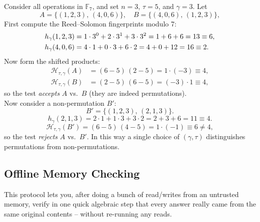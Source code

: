 \documentclass[../../book]{subfiles}
\begin{document}
\begin{example}
    Consider all operations in $\mathbb{F}_7$, and set $n=3$, $\tau=5$, and $\gamma=3$.  
    Let
    \begin{equation*}
      A = \{(1,2,3),\,(4,0,6)\}, \quad
      B = \{(4,0,6),\,(1,2,3)\},
    \end{equation*}
    First compute the Reed–Solomon fingerprints modulo 7:
    \begin{align*}
        h_{\gamma}(1,2,3) &=1\cdot3^0 + 2\cdot3^1 + 3\cdot3^2 =1 + 6 + 6 =13 \equiv 6,\\
        h_{\gamma}(4,0,6) &=4\cdot1 + 0\cdot3 + 6\cdot2 =4 + 0 + 12 =16 \equiv 2.
        \vspace{-5px}
    \end{align*}
    Now form the shifted products:
    \begin{align*}
        \mathcal{H}_{\tau,\gamma}(A) &=(6-5)\,(2-5) =1\cdot(-3)\equiv4,\\
        \mathcal{H}_{\tau,\gamma}(B) &=(2-5)\,(6-5) =(-3)\cdot1\equiv4,
    \end{align*}
    so the test \emph{accepts} $A$ vs.\ $B$ (they are indeed permutations). \\

    Now consider a non-permutation $B'$:
    \begin{equation*}
      B' = \{(1,2,3),\,(2,1,3)\}.
    \end{equation*}
    \begin{equation*}
      h_{\gamma}(2,1,3) =2\cdot1 + 1\cdot3 + 3\cdot2 =2 + 3 + 6 =11 \equiv 4.
    \end{equation*}
    \begin{equation*}
      \mathcal{H}_{\tau,\gamma}(B') =(6-5)\,(4-5) =1\cdot(-1)\equiv6\neq4,
    \end{equation*}
    so the test \emph{rejects} $A$ vs.\ $B'$.  
    In this way a single choice of $(\gamma,\tau)$ distinguishes permutations from non-permutations.
\end{example}

\subsection{Offline Memory Checking}
\label{sec:offline-memory-checking}

This protocol lets you, after doing a bunch of read/writes from an untrusted memory, verify in one quick
algebraic step that every answer really came from the same original contents -- without re-running any reads.
\end{document}
